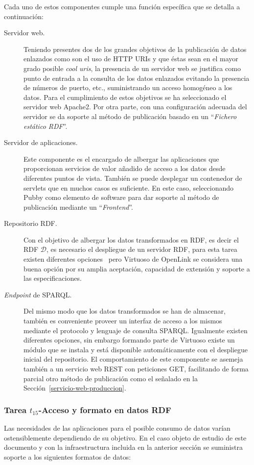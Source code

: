 Cada uno de estos componentes cumple una función específica que se detalla a continuación:
\begin{description}
 \item [Servidor web.] Teniendo presentes dos de los grandes objetivos de la publicación de datos enlazados como son el uso 
de HTTP URIs y que éstas sean en el mayor grado posible \textit{cool uris}, la presencia de un servidor web se justifica como punto 
de entrada a la consulta de los datos enlazados evitando la presencia de números de puerto, etc., suministrando un acceso 
homogéneo a los datos. Para el cumplimiento de estos objetivos se ha seleccionado el servidor web Apache2. Por otra parte, con una configuración adecuada 
del servidor se da soporte al método de publicación basado en un ``\textit{Fichero estático RDF}''.
\item [Servidor de aplicaciones.] Este componente es el encargado de albergar las aplicaciones que proporcionan servicios de valor añadido 
de acceso a los datos desde diferentes puntos de vista. También se puede desplegar un contenedor de servlets que en muchos casos es suficiente. En este caso, 
seleccionando Pubby como elemento de software para dar soporte al método de publicación mediante un ``\linkeddata \textit{Frontend}''.
\item [Repositorio RDF.] Con el objetivo de albergar los datos transformados en RDF, es decir el \dataset RDF $\mathcal{D}$, es necesario el despliegue 
de un servidor RDF, para esta tarea existen diferentes opciones~\cite{5638466} pero Virtuoso de OpenLink se considera una buena opción por su amplia aceptación, 
capacidad de extensión y soporte a las especificaciones.
\item [\textit{Endpoint} de \gls{SPARQL}.] Del mismo modo que los datos transformados se han de almacenar, también es conveniente proveer un interfaz de acceso 
a los mismos mediante el protocolo y lenguaje de consulta SPARQL. Igualmente existen diferentes opciones, sin embargo formando parte de Virtuoso existe un módulo 
que se instala y está disponible automáticamente con el despliegue inicial del repositorio. El comportamiento de este componente se asemeja también a 
un servicio web \gls{REST} con peticiones GET, facilitando de forma parcial otro método de publicación como el señalado en la Sección~\ref{servicio-web-produccion}.
\end{description}
% 
\subsubsection{Tarea $t_{15}$-Acceso y formato en datos RDF}\label{t15-comun}
Las necesidades de las aplicaciones para el posible consumo de datos varían ostensiblemente 
dependiendo de su objetivo. En el caso objeto de estudio de este documento y con la infraestructura 
incluida en la anterior sección se suministra soporte a los siguientes formatos de datos:

